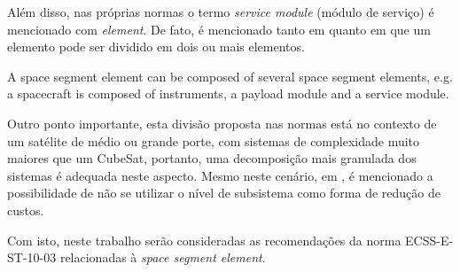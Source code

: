 Além disso, nas próprias normas o termo \textit{service module} (módulo de serviço) é mencionado com \textit{element}. De fato, é mencionado tanto em \textcite{ecss-s-st-00-01} quanto em \textcite{ecss-e-st-10-03} que um elemento pode ser dividido em dois ou mais elementos.

\begin{citacao}
    A space segment element can be composed of several space segment elements, e.g. a spacecraft is composed of instruments, a payload module and a service module. \cite[p. 10]{ecss-s-st-00-01}
\end{citacao}

Outro ponto importante, esta divisão proposta nas normas está no contexto de um satélite de médio ou grande porte, com sistemas de complexidade muito maiores que um CubeSat, portanto, uma decomposição mais granulada dos sistemas é adequada neste aspecto.
Mesmo neste cenário, em \textcite{ecss-e-hb-10-02}, é mencionado a possibilidade de não se utilizar o nível de subsistema como forma de redução de custos.

Com isto, neste trabalho serão consideradas as recomendações da norma ECSS-E-ST-10-03 \cite{ecss-e-st-10-03} relacionadas à \textit{space segment element}.




